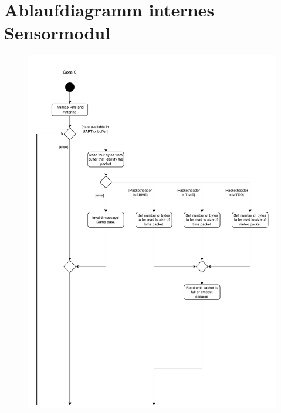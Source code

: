 \documentclass[a4paper,11pt]{article}
\begin{document}
\newpage
\section{Ablaufdiagramm internes Sensormodul}

\begin{figure}[H]
  \centering
  \includegraphics[scale=0.75, page=1]{Ablauf intern.pdf}
\end{figure}
\end{document}
